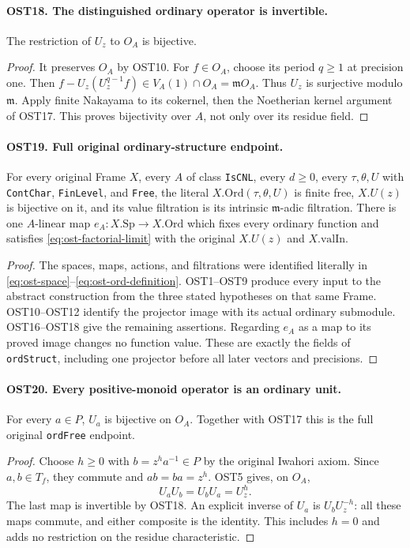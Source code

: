 \documentclass[11pt,a4paper]{article}
\numberwithin{equation}{section}
\theoremstyle{remark}\newtheorem{remark}[theorem]{Remark}
\begin{document}
\paragraph{OST18. The distinguished ordinary operator is invertible.}
\label{claim:OST18}
The restriction of $U_z$ to $O_A$ is bijective.
\begin{proof}
It preserves $O_A$ by OST10.  For $f\in O_A$, choose its
period $q\geq1$ at precision one.  Then
$f-U_z(U_z^{q-1}f)\in V_A(1)\cap O_A=\mathfrak mO_A$.
Thus $U_z$ is surjective modulo $\mathfrak m$.  Apply finite
Nakayama to its cokernel, then the Noetherian kernel argument
of OST17.  This proves bijectivity over $A$, not only over
its residue field.
\end{proof}

\paragraph{OST19. Full original ordinary-structure endpoint.}
\label{claim:OST19}
For every original Frame $X$, every $A$ of class
\texttt{Is\allowbreak CNL}, every $d\geq0$, every $\tau,\theta,\allowbreak{} U$ with
\texttt{Cont\allowbreak Char}, \texttt{Fin\allowbreak Level}, and \texttt{Free}, the
literal $X.\mathrm{Ord}(\tau,\theta,\allowbreak{} U)$ is finite free,
$X.U(z)$ is bijective on it, and its value filtration is its
intrinsic $\mathfrak m$-adic filtration.  There is one
$A$-linear map $e_A:X.\mathrm{Sp}\to X.\mathrm{Ord}$ which
fixes every ordinary function and satisfies
\eqref{eq:ost-factorial-limit} with the original
$X.U(z)$ and $X.\mathrm{valIn}$.
\begin{proof}
The spaces, maps, actions, and filtrations were identified
literally in \eqref{eq:ost-space}--\eqref{eq:ost-ord-definition}.
OST1--OST9 produce every input to the abstract construction
from the three stated hypotheses on that same Frame.
OST10--OST12 identify the projector image with its actual
ordinary submodule.  OST16--OST18 give the remaining
assertions.  Regarding $e_A$ as a map to its proved image
changes no function value.  These are exactly the fields
of \texttt{ord\allowbreak Struct}, including one projector before all
later vectors and precisions.
\end{proof}

\paragraph{OST20. Every positive-monoid operator is an ordinary unit.}
\label{claim:OST20}
For every $a\in P$, $U_a$ is bijective on $O_A$.  Together
with OST17 this is the full original \texttt{ord\allowbreak Free} endpoint.
\begin{proof}
Choose $h\geq0$ with $b=z^ha^{-1}\in P$ by the original
Iwahori axiom.  Since $a,\allowbreak{} b\in T_f$, they commute and
$ab=ba=z^h$.  OST5 gives, on $O_A$,
\[
                  U_aU_b=U_bU_a=U_z^h.
\]
The last map is invertible by OST18.  An explicit inverse of
$U_a$ is $U_bU_z^{-h}$: all these maps commute, and either
composite is the identity.  This includes $h=0$ and adds no
restriction on the residue characteristic.
\end{proof}
\end{document}
